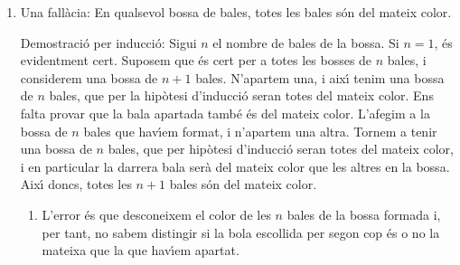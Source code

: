 \begin{enumerate}
(iii) De (i) i (ii) es dedueix que $\frac{4x-40}{13-x}=\frac{4x-40}{7-x}$.

(iv) At\`{e}s que els numeradors s\'{o}n iguals, els denominadors tamb\'{e} ho
han de ser. \'{E}s a dir, de (iii) es dedueix que $7-x=13-x$.

(v) De (iv) es dedueix que 7 = 13. Absurd!

En algun dels passos (i)--(v) hi ha d'haver un error. Quin \'{e}s ? Per
qu\`{e} ?

\begin{enumerate}
\item pas (ii) perqu\`{e} es dedueix $\frac{x+5}{x-7}-5=\frac{40-4x}{x-7}.$

\item pas (iv) perqu\`{e} es dedueix $\left(  4x-40\right)  \left(
7-x\right)  =\left(  4x-40\right)  \left(  13-x\right)  $ i, d'aqu\'{\i} no
s'obt\'{e} $7-x=13-x$ llevat que $x\neq10$ (*)

\item pas (iv) perqu\`{e} es dedueix $13-x=x-7$

\item pas (v) perqu\`{e} \ es dedueix $2x=20$ i, per tant, $x=10$.
\end{enumerate}

\item Una fal\textperiodcentered l\`{a}cia: En qualsevol bossa de bales, totes
les bales s\'{o}n del mateix color.

Demostraci\'{o} per inducci\'{o}: Sigui $n$ el nombre de bales de la bossa. Si
$n=1$, \'{e}s evidentment cert. Suposem que \'{e}s cert per a totes les bosses
de $n$ bales, i considerem una bossa de $n+1$ bales. N'apartem una, i
aix\'{\i} tenim una bossa de $n$ bales, que per la hip\`{o}tesi d'inducci\'{o}
seran totes del mateix color. Ens falta provar que la bala apartada tamb\'{e}
\'{e}s del mateix color. L'afegim a la bossa de $n$ bales que hav\'{\i}em
format, i n'apartem una altra. Tornem a tenir una bossa de $n$ bales, que per
hip\`{o}tesi d'inducci\'{o} seran totes del mateix color, i en particular la
darrera bala ser\`{a} del mateix color que les altres en la bossa. Aix\'{\i}
doncs, totes les $n+1$ bales s\'{o}n del mateix color.

\begin{enumerate}
\item L'error \'{e}s que desconeixem el color de les $n$ bales de la bossa
formada i, per tant, no sabem distingir si la bola escollida per segon cop
\'{e}s o no la mateixa que la que hav\'{\i}em apartat.


\end{enumerate}
\end{enumerate}
